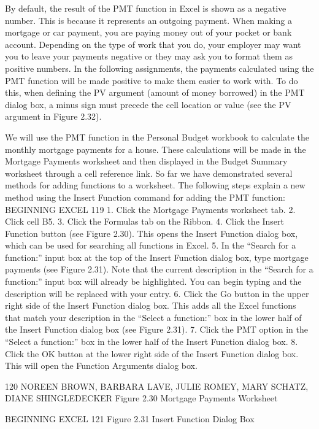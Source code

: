 By default, the result of the PMT function in Excel is shown as a negative number. This is because
it represents an outgoing payment. When making a mortgage or car payment, you are paying money
out of your pocket or bank account. Depending on the type of work that you do, your employer may
want you to leave your payments negative or they may ask you to format them as positive numbers.
In the following assignments, the payments calculated using the PMT function will be made positive
to make them easier to work with. To do this, when defining the PV argument (amount of money
borrowed) in the PMT dialog box, a minus sign must precede the cell location or value (see the PV
argument in Figure 2.32).

We will use the PMT function in the Personal Budget workbook to calculate the monthly mortgage
payments for a house. These calculations will be made in the Mortgage Payments worksheet and
then displayed in the Budget Summary worksheet through a cell reference link. So far we have
demonstrated several methods for adding functions to a worksheet. The following steps explain a new
method using the Insert Function command for adding the PMT function:
BEGINNING EXCEL 119
1.   Click the Mortgage Payments worksheet tab.
2.   Click cell B5.
3.   Click the Formulas tab on the Ribbon.
4.   Click the Insert Function button (see Figure 2.30). This opens the Insert Function dialog box,
which can be used for searching all functions in Excel.
5.   In the “Search for a function:” input box at the top of the Insert Function dialog box,
type mortgage payments (see Figure 2.31). Note that the current description in the “Search for
a function:” input box will already be highlighted. You can begin typing and the description will
be replaced with your entry.
6.   Click the Go button in the upper right side of the Insert Function dialog box. This adds all the
Excel functions that match your description in the “Select a function:” box in the lower half of
the Insert Function dialog box (see Figure 2.31).
7.   Click the PMT option in the “Select a function:” box in the lower half of the Insert Function
dialog box.
8.   Click the OK button at the lower right side of the Insert Function dialog box. This will open the
Function Arguments dialog box.




120 NOREEN BROWN, BARBARA LAVE, JULIE ROMEY, MARY SCHATZ, DIANE SHINGLEDECKER
Figure 2.30 Mortgage Payments Worksheet




BEGINNING EXCEL 121
Figure 2.31 Insert Function Dialog Box




